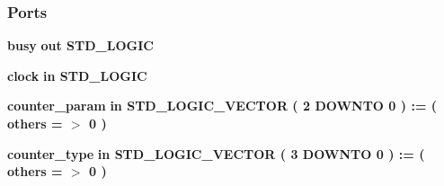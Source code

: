 \subsubsection*{Ports}
 \begin{DoxyCompactItemize}
\item 
{\bf busy}  {\bfseries {\bfseries \textcolor{keywordflow}{out}\textcolor{vhdlchar}{ }}} {\bfseries \textcolor{comment}{S\+T\+D\+\_\+\+L\+O\+G\+IC}\textcolor{vhdlchar}{ }} 
\item 
{\bf clock}  {\bfseries {\bfseries \textcolor{keywordflow}{in}\textcolor{vhdlchar}{ }}} {\bfseries \textcolor{comment}{S\+T\+D\+\_\+\+L\+O\+G\+IC}\textcolor{vhdlchar}{ }} 
\item 
{\bf counter\+\_\+param}  {\bfseries {\bfseries \textcolor{keywordflow}{in}\textcolor{vhdlchar}{ }}} {\bfseries \textcolor{comment}{S\+T\+D\+\_\+\+L\+O\+G\+I\+C\+\_\+\+V\+E\+C\+T\+OR}\textcolor{vhdlchar}{ }\textcolor{vhdlchar}{(}\textcolor{vhdlchar}{ }\textcolor{vhdlchar}{ } \textcolor{vhdldigit}{2} \textcolor{vhdlchar}{ }\textcolor{keywordflow}{D\+O\+W\+N\+TO}\textcolor{vhdlchar}{ }\textcolor{vhdlchar}{ } \textcolor{vhdldigit}{0} \textcolor{vhdlchar}{ }\textcolor{vhdlchar}{)}\textcolor{vhdlchar}{ }\textcolor{vhdlchar}{ }\textcolor{vhdlchar}{ }\textcolor{vhdlchar}{\+:}\textcolor{vhdlchar}{=}\textcolor{vhdlchar}{ }\textcolor{vhdlchar}{(}\textcolor{vhdlchar}{ }\textcolor{vhdlchar}{ }\textcolor{keywordflow}{others}\textcolor{vhdlchar}{ }\textcolor{vhdlchar}{ }\textcolor{vhdlchar}{=}\textcolor{vhdlchar}{ }\textcolor{vhdlchar}{$>$}\textcolor{vhdlchar}{ }\textcolor{vhdlchar}{\textquotesingle{}}\textcolor{vhdlchar}{ } \textcolor{vhdldigit}{0} \textcolor{vhdlchar}{ }\textcolor{vhdlchar}{\textquotesingle{}}\textcolor{vhdlchar}{ }\textcolor{vhdlchar}{)}\textcolor{vhdlchar}{ }} 
\item 
{\bf counter\+\_\+type}  {\bfseries {\bfseries \textcolor{keywordflow}{in}\textcolor{vhdlchar}{ }}} {\bfseries \textcolor{comment}{S\+T\+D\+\_\+\+L\+O\+G\+I\+C\+\_\+\+V\+E\+C\+T\+OR}\textcolor{vhdlchar}{ }\textcolor{vhdlchar}{(}\textcolor{vhdlchar}{ }\textcolor{vhdlchar}{ } \textcolor{vhdldigit}{3} \textcolor{vhdlchar}{ }\textcolor{keywordflow}{D\+O\+W\+N\+TO}\textcolor{vhdlchar}{ }\textcolor{vhdlchar}{ } \textcolor{vhdldigit}{0} \textcolor{vhdlchar}{ }\textcolor{vhdlchar}{)}\textcolor{vhdlchar}{ }\textcolor{vhdlchar}{ }\textcolor{vhdlchar}{ }\textcolor{vhdlchar}{\+:}\textcolor{vhdlchar}{=}\textcolor{vhdlchar}{ }\textcolor{vhdlchar}{(}\textcolor{vhdlchar}{ }\textcolor{vhdlchar}{ }\textcolor{keywordflow}{others}\textcolor{vhdlchar}{ }\textcolor{vhdlchar}{ }\textcolor{vhdlchar}{=}\textcolor{vhdlchar}{ }\textcolor{vhdlchar}{$>$}\textcolor{vhdlchar}{ }\textcolor{vhdlchar}{\textquotesingle{}}\textcolor{vhdlchar}{ } \textcolor{vhdldigit}{0} \textcolor{vhdlchar}{ }\textcolor{vhdlchar}{\textquotesingle{}}\textcolor{vhdlchar}{ }\textcolor{vhdlchar}{)}\textcolor{vhdlchar}{ }} 

\end{DoxyCompactItemize}
